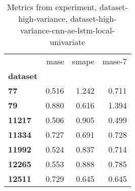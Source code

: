 \begin{table}[h]
\centering
\caption{Metrics from experiment, dataset-high-variance, dataset-high-variance-cnn-ae-lstm-local-univariate}
\label{table:dataset-high-variance-cnn-ae-lstm-local-univariate-dataset-high-variance}
\begin{tabular}{lrrr}
\toprule
{} &   mase &  smape &  mase-7 \\
\textbf{dataset} &        &        &         \\
\midrule
\textbf{77     } &  0.516 &  1.242 &   0.711 \\
\textbf{79     } &  0.880 &  0.616 &   1.394 \\
\textbf{11217  } &  0.506 &  0.905 &   0.499 \\
\textbf{11334  } &  0.727 &  0.691 &   0.728 \\
\textbf{11992  } &  0.524 &  0.837 &   0.714 \\
\textbf{12265  } &  0.553 &  0.888 &   0.785 \\
\textbf{12511  } &  0.729 &  0.645 &   0.645 \\
\bottomrule
\end{tabular}
\end{table}
